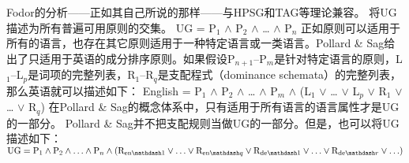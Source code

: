 Fodor的分析——正如其自己所说的那样\citep[]{Fodor2001a}——与HPSG\indexhpsgc 和TAG\indextagc 等理论兼容。 \citet[]{ps}将UG描述为所有普遍可用原则的交集。
\ea
UG = P$_1$ $\wedge$ P$_2$ $\wedge$ \ldots{} $\wedge$ P$_n$
\z
正如原则可以适用于所有的语言，也存在其它原则适用于一种特定语言或一类语言。Pollard \& Sag给出了只适用于英语的成分排序原则。如果假设P$_{n + 1}$--P$_m$是针对特定语言的原则，L$_{1}$--L$_p$是词项的完整列表，R$_{1}$--R$_q$是支配程式（dominance schemata）的完整列表，那么英语就可以描述如下：
\ea
English = P$_1$ $\wedge$ P$_2$ $\wedge$ \ldots{} $\wedge$ P$_m$ $\wedge$ (L$_{1}$ $\vee$ \ldots{}
$\vee$ L$_p$ $\vee$ R$_{1}$ $\vee$ \ldots{} $\vee$  R$_q$)
\z
在Pollard \& Sag的概念体系中，只有适用于所有语言的语言属性才是UG的一部分。 Pollard \& Sag并不把支配规则当做UG的一部分。但是，也可以将UG描述如下：
\ea
$
\mathrm{UG} = 
  \mathrm{P}_1 
  \wedge 
  \mathrm{P}_2 
  \wedge 
  \ldots 
  \wedge 
  \mathrm{P}_n 
  \wedge
              (\mathrm{R}_{\mathrm{en}\mathdash1} 
              \vee 
              \ldots 
              \vee 
              \mathrm{R}_{\mathrm{en}\mathdash q} 
              \vee  
              \mathrm{R}_{\mathrm{de}\mathdash1} 
              \vee 
              \ldots 
              \vee 
              \mathrm{R}_{\mathrm{de}\mathdash r}
	      \vee 
	      \ldots)
$
\z

